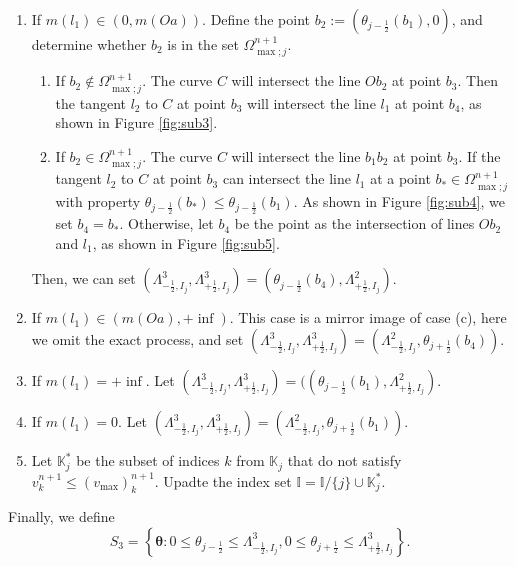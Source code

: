 \documentclass[times,final,11pt]{elsarticle}
\numberwithin{equation}{section}
\theoremstyle{definition}
\theoremstyle{remark}
\begin{document}
\begin{enumerate}[label=(\roman*),leftmargin=6mm]
\begin{enumerate}
		\item[(c)] If $m(l_1) \in (0, m(Oa))$. Define the point $b_2 := (\theta_{j - \frac12}(b_1), 0)$, and determine whether $b_2$ is in the set $\Omega_{{\max};j}^{n+1}$.
		\begin{enumerate}
			\item[(i)] If $b_2 \notin \Omega_{{\max};j}^{n+1}$. The curve $C$ will intersect the line $Ob_2$ at point $b_3$. Then the tangent $l_2$ to $C$ at point $b_3$ will intersect the line $l_1$ at point $b_4$, as shown in Figure \ref{fig:sub3}.
			\item[(ii)] If $b_2 \in \Omega_{{\max};j}^{n+1}$. The curve $C$ will intersect the line $b_1b_2$ at point $b_3$. 
			If the tangent $l_2$ to $C$ at point $b_3$ can intersect the line $l_1$ at a point $b_* \in \Omega_{{\max};j}^{n+1}$ with property ${\theta}_{j - \frac12}(b_*) \leq {\theta}_{j - \frac12}(b_1)$. As shown in Figure \ref{fig:sub4}, we set $b_4 = b_*$. Otherwise, let $b_4$ be the point as the intersection of lines $Ob_2$ and $l_1$, as shown in Figure \ref{fig:sub5}. 
		\end{enumerate}
		Then, we can set $(\Lambda_{- \frac{1}{2}, I_j}^3, \Lambda_{+ \frac{1}{2}, I_j}^3) = ({\theta}_{j - \frac12}(b_4), \Lambda_{+ \frac{1}{2}, I_j}^2)$. 

		\item[(d)] If $m(l_1) \in (m(Oa), + \inf)$. This case is a mirror image of case (c), here we omit the exact process, and set $(\Lambda_{- \frac{1}{2}, I_j}^3, \Lambda_{+ \frac{1}{2}, I_j}^3) = (\Lambda_{- \frac{1}{2}, I_j}^2, {\theta}_{j + \frac12}(b_4))$. 

		\item[(e)] If $m(l_1) = + \inf$. Let $(\Lambda_{- \frac{1}{2}, I_j}^3, \Lambda_{+ \frac{1}{2}, I_j}^3) = (({\theta}_{j - \frac12}(b_1), \Lambda_{+ \frac{1}{2}, I_j}^2)$.

		\item[(f)] If $m(l_1) = 0$. Let $(\Lambda_{- \frac{1}{2}, I_j}^3, \Lambda_{+ \frac{1}{2}, I_j}^3) = (\Lambda_{- \frac{1}{2}, I_j}^2, {\theta}_{j + \frac12}(b_1))$.

		\item[(g)] Let $\mathbb{K}_j^*$ be the subset of indices $k$ from $\mathbb{K}_j$ that do not satisfy $v_k^{n + 1} \leq (v_{\max})_k^{n + 1}$. Upadte the index set $\mathbb{I} = \mathbb{I} / \{j\} \cup \mathbb{K}_j^*$.
	\end{enumerate}
	Finally, we define 
	\begin{equation*}
	    S_3 = \left\{\boldsymbol{\theta}: 0 \leq \theta_{j - \frac{1}{2}} \leq \Lambda_{- \frac{1}{2}, I_j}^3, 0 \leq \theta_{j + \frac{1}{2}} \leq \Lambda_{+ \frac{1}{2}, I_j}^3  \right\}.
	\end{equation*}
\end{enumerate}
\end{document}
